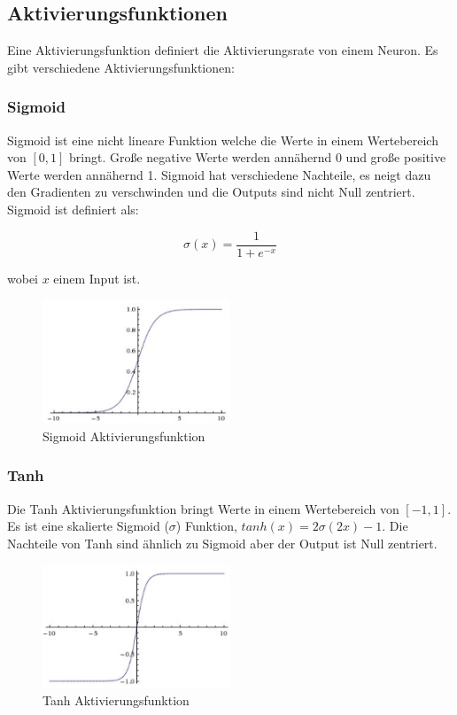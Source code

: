 \subsection{Aktivierungsfunktionen}\label{subsection:aktivierungsfunktionen}
Eine Aktivierungsfunktion definiert die Aktivierungsrate von einem Neuron. Es gibt verschiedene Aktivierungsfunktionen:

\subsubsection{Sigmoid}
Sigmoid ist eine nicht lineare Funktion welche die Werte in einem Wertebereich von $ [0, 1] $ bringt.
Große negative Werte werden annähernd 0 und große positive Werte werden annähernd 1. Sigmoid hat verschiedene Nachteile, es neigt dazu den Gradienten zu verschwinden
und die Outputs sind nicht Null zentriert. Sigmoid ist definiert als:

\begin{equation}
  \sigma(x) = \frac{1}{1 + e^{-x}}
\end{equation}

wobei $x$ einem Input ist.

\begin{figure}[H]
  \centering
  \includegraphics[width=0.5\textwidth]{resources/nn/sigmoid.png}
  \caption{
    Sigmoid Aktivierungsfunktion 
    \cite{neuron-model}
  }
  \label{image:sigmoid}
\end{figure}

\subsubsection{Tanh}
Die Tanh Aktivierungsfunktion bringt Werte in einem Wertebereich von $ [-1, 1] $. Es ist eine skalierte Sigmoid ($ \sigma $) Funktion,
$ tanh(x) = 2\sigma(2x) - 1 $. Die Nachteile von Tanh sind ähnlich zu Sigmoid aber der Output ist Null zentriert.

\begin{figure}[H]
  \centering
  \includegraphics[width=0.5\textwidth]{resources/nn/tanh.png}
  \caption{
    Tanh Aktivierungsfunktion 
    \cite{neuron-model}
  }
  \label{image:tanh}
\end{figure}

